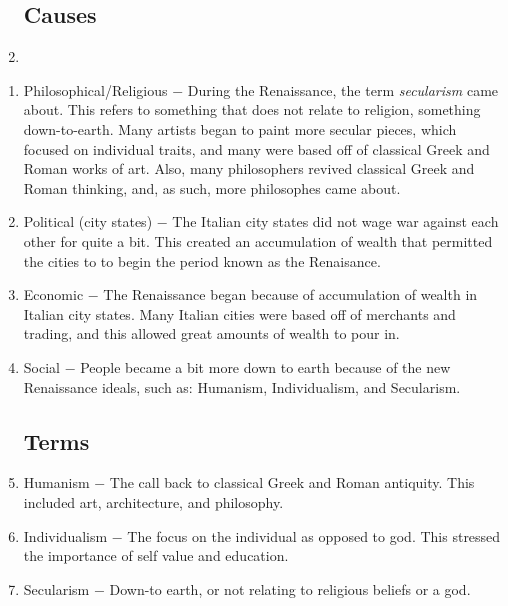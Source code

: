 \documentclass[12pt]{article}
\begin{document}
\begin{enumerate}[label=]
\subsection{Causes}
\item
\end{enumerate}
\vspace{-35pt}
\begin{enumerate}

    \item Philosophical/Religious $-$ During the Renaissance, the term \textit{secularism} came about. This refers to something that does not relate to religion, something down-to-earth. Many artists began to paint more secular pieces, which focused on individual traits, and many were based off of classical Greek and Roman works of art. Also, many philosophers revived classical Greek and Roman thinking, and, as such, more philosophes came about.

\item Political (city states) $-$ The Italian city states did not wage war against each other for quite a bit. This created an accumulation of wealth that permitted the cities to to begin the period known as the Renaisance.

\item Economic $-$ The Renaissance began because of accumulation of wealth in Italian city states. Many Italian cities were based off of merchants and trading, and this allowed great amounts of wealth to pour in.

\item Social $-$ People became a bit more down to earth because of the new Renaissance ideals, such as: Humanism, Individualism, and Secularism.

\subsection{Terms}

\item Humanism $-$ The call back to classical Greek and Roman antiquity. This included art, architecture, and philosophy.

\item Individualism $-$ The focus on the individual as opposed to god. This stressed the importance of self value and education.

\item Secularism $-$ Down-to earth, or not relating to religious beliefs or a god.


\end{enumerate}
\end{document}
